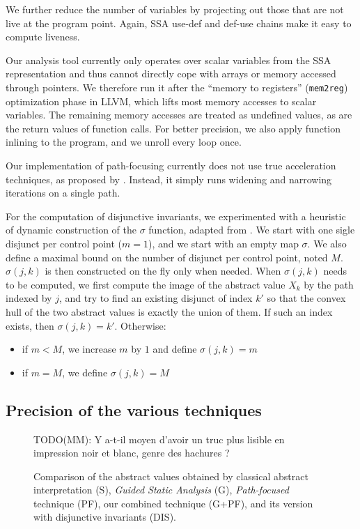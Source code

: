 \documentclass[preprint]{sigplanconf}
\newcommand{\MM}[1]{{\color{blue} TODO(MM): #1}}
\begin{document}
We further reduce the number of variables by projecting out those that are not live at the program point. Again, SSA use-def and def-use chains make it easy to compute liveness.

Our analysis tool currently only operates over scalar variables from the SSA representation and thus cannot directly cope with arrays or memory accessed through pointers. We therefore run it after the ``memory to registers'' (\texttt{mem2reg}) optimization phase in LLVM, which lifts most memory accesses to scalar variables.
The remaining memory accesses are treated as undefined values, as are the return
values of function calls. For better precision, we also apply function inlining
to the program, and we unroll every loop once.

Our implementation of path-focusing currently does not use true acceleration techniques, as proposed by \citet{Monniaux_Gonnord_SAS11}. Instead, it simply runs widening and narrowing iterations on a single path.

For the computation of disjunctive invariants, we experimented with a heuristic
of dynamic construction of the $\sigma$ function, adapted from
\cite{DBLP:conf/pldi/GulwaniZ10}.  We start with one sigle
disjunct per control point ($m=1$), and we start with an empty map $\sigma$. We also
define a maximal bound on the number of disjunct per control point, noted $M$.
$\sigma(j,k)$ is then constructed on the fly only when needed.
When $\sigma(j,k)$ needs to be computed, we first compute the image of the
abstract value $X_k$ by the path indexed by $j$, and try to find an existing
disjunct of index $k'$ so that the convex hull of the two abstract values is
exactly the union of them. If such an index exists, then $\sigma(j,k) = k'$.
Otherwise:
\begin{itemize}
	\item if $m < M$, we increase $m$ by $1$ and define $\sigma(j,k) = m$
	\item if $m = M$, we define $\sigma(j,k) = M$
\end{itemize}


\subsection{Precision of the various techniques}

\begin{figure}[h]
  \MM{Y a-t-il moyen d'avoir un truc plus lisible en impression noir
    et blanc, genre des hachures ?}
  \begin{center}
    
  \end{center} 
  \vspace{-20px}
  \caption{Comparison of the abstract values obtained by classical abstract
  interpretation (S), \emph{Guided Static
  Analysis} (G), \emph{Path-focused} technique (PF), our combined technique
  (G+PF), and its version with disjunctive invariants (DIS).}
  \label{fig:techniques}
\end {figure}
\end{document}
